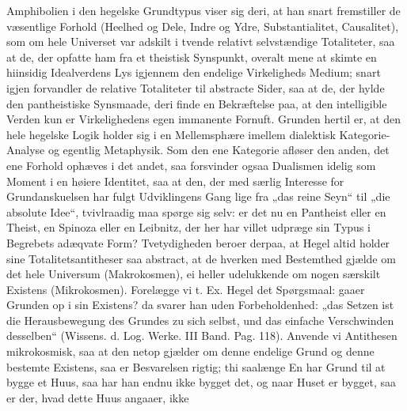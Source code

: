 \documentclass[12pt]{book}
\newcommand{\opage}[1]{\marginnote{\footnotesize\textit{[#1]}}}
\begin{document}
\opage{190} Amphibolien i den hegelske Grundtypus viser sig deri, at han snart fremstiller de
væsentlige Forhold (Heelhed og Dele, Indre og Ydre, Substantialitet, Causalitet), som om
hele Universet var adskilt i tvende relativt selvstændige Totaliteter, saa at de, der
opfatte ham fra et theistisk Synspunkt, overalt mene at skimte en hiinsidig Idealverdens
Lys igjennem den endelige Virkeligheds Medium; snart igjen forvandler de relative
Totaliteter til abstracte Sider, saa at de, der hylde den pantheistiske Synsmaade, deri
finde en Bekræftelse paa, at den intelligible Verden kun er Virkelighedens egen immanente
Fornuft. Grunden hertil er, at den hele hegelske Logik holder sig i en Mellemsphære
imellem dialektisk Kategorie-Analyse og egentlig Metaphysik. Som den ene Kategorie afløser
den anden, det ene Forhold ophæves i det andet, saa forsvinder ogsaa Dualismen idelig som
Moment i en høiere Identitet, saa at den, der med særlig Interesse for Grundanskuelsen har
fulgt Udviklingens Gang lige fra „das reine Seyn“ til „die absolute Idee“, tvivlraadig maa
spørge sig selv: er det nu en Pantheist eller en Theist, en Spinoza eller en Leibnitz, der
her har villet udpræge sin Typus i Begrebets adæqvate Form? Tvetydigheden beroer derpaa,
at Hegel altid holder sine Totalitetsantitheser saa abstract, at de hverken med Bestemthed
gjælde om det hele Universum (Makrokosmen), ei heller udelukkende om nogen særskilt
Existens (Mikrokosmen). Forelægge vi t. Ex. Hegel det Spørgsmaal: gaaer Grunden op i sin
Existens? da svarer han uden Forbeholdenhed: „das Setzen ist die Herausbewegung des
Grundes zu sich selbst, und das einfache Verschwinden desselben“ (Wissens. d. Log. Werke.
III Band. Pag. 118). Anvende vi Antithesen mikrokosmisk, saa at den netop gjælder om denne
endelige Grund og denne bestemte Existens,
\opage{191} saa er Besvarelsen rigtig; thi saalænge En har Grund til at bygge et Huus, saa har han
endnu ikke bygget det, og naar Huset er bygget, saa er der, hvad dette Huus angaaer, ikke
\end{document}
